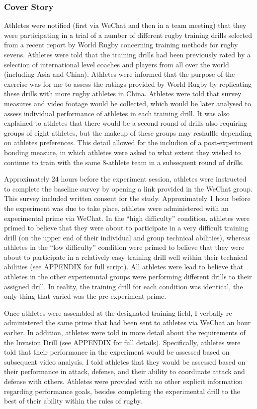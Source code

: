 \documentclass[english]{article}\usepackage[]{graphicx}\usepackage[]{color}
\begin{document}
\subsubsection{Cover Story}
Athletes were notified (first via WeChat and then in a team meeting) that they were participating in a trial of a number of different rugby training drills selected from a recent report by World Rugby concerning training methods for rugby sevens.  Athletes were told that the training drills had been previously rated by a selection of international level coaches and players from all over the world (including Asia and China).  Athletes were informed that the purpose of the exercise was for me to assess the ratings provided by World Rugby by replicating these drills with more rugby athletes in China.  Athletes were told that survey measures and video footage would be collected, which would be later analysed to assess individual performance of athletes in each training drill.  It was also explained to athletes that there would be a second round of drills also requiring groups of eight athletes, but the makeup of these groups may reshuffle depending on athletes preferences.  This detail allowed for the includion of a post-experiment bonding measure, in which athletes were asked to what extent they wished to continue to train with the same 8-athlete team in a subsequent round of drills.

Approximately 24 hours before the experiment session, athletes were instructed to complete the baseline survey by opening a link provided in the WeChat group.  This survey included written consent for the study. Approximately 1 hour before the experiment was due to take place, athletes were administered with an experimental prime via WeChat.  In the ``high difficulty'' condition, athletes were primed to believe that they were about to participate in a very difficult training drill (on the upper end of their individual and group technical abilities), whereas athletes in the ``low difficulty'' condition were primed to believe that they were about to participate in a relatively easy training drill well within their technical abilities (see APPENDIX for full script). All athletes were lead to believe that athletes in the other experiemntal groups were performing different drills to their assigned drill. In reality, the training drill for each condition was identical, the only thing that varied was the pre-experiment prime.

Once athletes were assembled at the designated training field, I verbally re-administered the same prime that had been sent to athletes via WeChat an hour earlier.  In addition, athletes were told in more detail about the requirements of the Invasion Drill (see APPENDIX for full details).  Specifically, athletes were told that their performance in the experiment would be assessed based on subsequent video analysis.  I told athletes that they would be assessed based on their performance in attack, defense, and their ability to coordinate attack and defense with others.  Athletes were provided with no other explicit information regarding performance goals, besides completing the experimental drill to the best of their ability within the rules of rugby.
\end{document}
